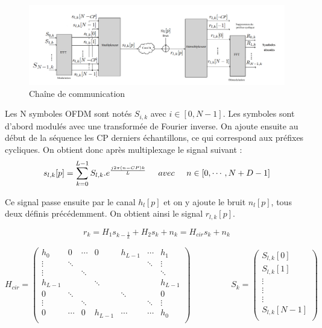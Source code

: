 \documentclass[11pt]{article}
\begin{document}
		\begin{figure}[h]
			\centering
			\includegraphics[scale=0.5]{img/chaine.png}
			\caption{Chaîne de communication}
			\label{chaine}
		\end{figure}
		
		Les N symboles OFDM sont notés $S_{i,k}$ avec $i\in [0, N-1]$. Les symboles sont d'abord modulés avec une transformée de Fourier inverse. On ajoute ensuite au début de la séquence les CP derniers échantillons, ce qui correspond aux préfixes cycliques. On obtient donc après multiplexage le signal suivant :\\
	\[ s_{l,k}[p] = \sum^{L-1}_{k=0}S_{l,k} . e^{\frac{j2\pi(n-CP)k}{L}} \hspace{0.5cm} avec \hspace{0.5cm} n\in [0, \cdots , N+D-1]\]
	
	Ce signal passe ensuite par le canal $h_l[p]$ et on y ajoute le bruit $n_l[p]$, tous deux définis précédemment. On obtient ainsi le signal $r_{l,k}[p]$.
	
	\[ r_{k} = H_{1}s_{k-\frac{1}{k}} + H_{2}s_{k} + n_{k} = H_{cir}s_{k} + n_{k} \]

\[
H_{cir} = 
\begin{pmatrix}
h_{0} & 0 & \cdots & 0 & h_{L-1} & \cdots & h_{1} \\
\vdots & \ddots & & & & \ddots & \vdots \\
\vdots & & \ddots & &  & & \ddots\\
h_{L-1} & & & \ddots & & & h_{L-1} \\
0 & \ddots & & & \ddots & & 0 \\
\vdots & & \ddots & & & \ddots & \vdots \\
0 & \cdots & 0 & h_{L-1} & \cdots & \cdots & h_{0} \\
\end{pmatrix} \hspace{2cm}
S_{k} =
\begin{pmatrix}
S_{l,k}[0] \\
S_{l,k}[1] \\
\vdots \\
\vdots \\
\vdots \\
S_{l,k}[N-1] \\ 
\end{pmatrix}
\]
\end{document}
